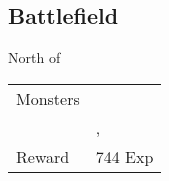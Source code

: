 \subsection{Battlefield}
\label{map:battlefield_11}

North of 

\noindent\begin{tabularx}{\textwidth}[l]{lX}
	Monsters
	& \nameref{monster:freezer_crab} \\
	& \nameref{monster:freezer_crab}, \nameref{monster:gather}
\\ \hline
	Reward & 744 Exp
\end{tabularx}
